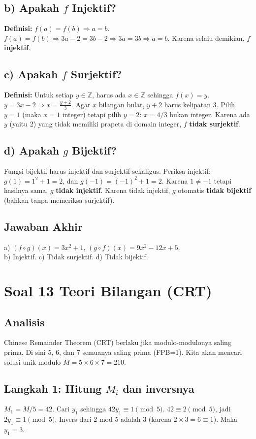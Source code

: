 \documentclass[12pt,a4paper]{article}
\begin{document}
\subsection*{b) Apakah $f$ Injektif?}
\textbf{Definisi:} $f(a) = f(b) \Rightarrow a = b$.
$f(a) = f(b) \Rightarrow 3a - 2 = 3b - 2 \Rightarrow 3a = 3b \Rightarrow a = b$.
Karena selalu demikian, $f$ \textbf{injektif}.

\subsection*{c) Apakah $f$ Surjektif?}
\textbf{Definisi:} Untuk setiap $y \in \mathbb{Z}$, harus ada $x \in \mathbb{Z}$ sehingga $f(x)=y$.
$y = 3x - 2 \Rightarrow x = \frac{y+2}{3}$. Agar $x$ bilangan bulat, $y+2$ harus kelipatan 3. Pilih $y = 1$ (maka $x=1$ integer) tetapi pilih $y=2$: $x = 4/3$ bukan integer. Karena ada $y$ (yaitu 2) yang tidak memiliki prapeta di domain integer, $f$ \textbf{tidak surjektif}.

\subsection*{d) Apakah $g$ Bijektif?}
Fungsi bijektif harus injektif dan surjektif sekaligus.
Periksa injektif: $g(1) = 1^2 + 1 = 2$, dan $g(-1) = (-1)^2 + 1 = 2$. Karena $1 \neq -1$ tetapi hasilnya sama, $g$ \textbf{tidak injektif}.
Karena tidak injektif, $g$ otomatis \textbf{tidak bijektif} (bahkan tanpa memeriksa surjektif).

\subsection*{Jawaban Akhir}
a) $(f\circ g)(x)=3x^2+1$, $(g\circ f)(x)=9x^2-12x+5$. \\
b) Injektif. c) Tidak surjektif. d) Tidak bijektif. 

\newpage
\section*{Soal 13 Teori Bilangan (CRT)}
\subsection*{Analisis}
Chinese Remainder Theorem (CRT) berlaku jika modulo-modulonya saling prima. Di sini 5, 6, dan 7 semuanya saling prima (FPB=1). Kita akan mencari solusi unik modulo $M = 5 \times 6 \times 7 = 210$.

\subsection*{Langkah 1: Hitung $M_i$ dan inversnya}
$M_1 = M/5 = 42$. Cari $y_1$ sehingga $42 y_1 \equiv 1 \pmod{5}$. $42 \equiv 2 \pmod{5}$, jadi $2y_1 \equiv 1 \pmod{5}$. Invers dari 2 mod 5 adalah 3 (karena $2 \times 3 = 6 \equiv 1$). Maka $y_1 = 3$.
\end{document}
